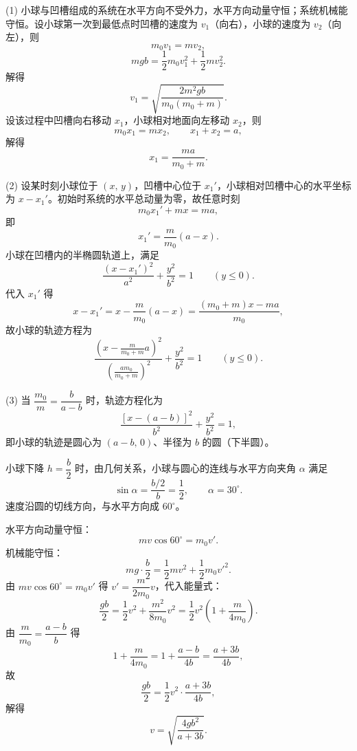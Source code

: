 \begin{answer}
(1) 小球与凹槽组成的系统在水平方向不受外力，水平方向动量守恒；系统机械能守恒。设小球第一次到最低点时凹槽的速度为 $v_{1}$（向右），小球的速度为 $v_{2}$（向左），则
\[
  m_{0}v_{1}=mv_{2},
\]
\[
  mgb=\frac{1}{2}m_{0}v_{1}^{2}+\frac{1}{2}mv_{2}^{2}.
\]
解得
\[
  v_{1}=\sqrt{\frac{2m^{2}gb}{m_{0}\left(m_{0}+m\right)}}.
\]
设该过程中凹槽向右移动 $x_{1}$，小球相对地面向左移动 $x_{2}$，则
\[
  m_{0}x_{1}=mx_{2},\qquad x_{1}+x_{2}=a,
\]
解得
\[
  x_{1}=\frac{ma}{m_{0}+m}.
\]

(2) 设某时刻小球位于 $(x,\,y)$，凹槽中心位于 $x_{1}'$，小球相对凹槽中心的水平坐标为 $x-x_{1}'$。初始时系统的水平总动量为零，故任意时刻
\[
  m_{0}x_{1}'+mx=ma,
\]
即
\[
  x_{1}'=\frac{m}{m_{0}}\left(a-x\right).
\]
小球在凹槽内的半椭圆轨道上，满足
\[
  \frac{\left(x-x_{1}'\right)^{2}}{a^{2}}+\frac{y^{2}}{b^{2}}=1\qquad(y\le0).
\]
代入 $x_{1}'$ 得
\[
  x-x_{1}'=x-\frac{m}{m_{0}}\left(a-x\right)
  =\frac{\left(m_{0}+m\right)x-ma}{m_{0}},
\]
故小球的轨迹方程为
\[
  \frac{\left(x-\frac{m}{m_{0}+m}a\right)^{2}}
       {\left(\frac{am_{0}}{m_{0}+m}\right)^{2}}
  +\frac{y^{2}}{b^{2}}=1\qquad(y\le0).
\]


(3) 当 $\dfrac{m_{0}}{m}=\dfrac{b}{a-b}$ 时，轨迹方程化为
\[
  \frac{\left[x-(a-b)\right]^{2}}{b^{2}}+\frac{y^{2}}{b^{2}}=1,
\]
即小球的轨迹是圆心为 $(a-b,\,0)$、半径为 $b$ 的圆（下半圆）。


小球下降 $h=\dfrac{b}{2}$ 时，由几何关系，小球与圆心的连线与水平方向夹角 $\alpha$ 满足
\[
  \sin\alpha=\frac{b/2}{b}=\frac{1}{2},\qquad \alpha=30^{\circ}.
\]
速度沿圆的切线方向，与水平方向成 $60^{\circ}$。

水平方向动量守恒：
\[
  mv\cos60^{\circ}=m_{0}v'.
\]
机械能守恒：
\[
  mg\cdot\frac{b}{2}=\frac{1}{2}mv^{2}+\frac{1}{2}m_{0}v'^{2}.
\]
由 $mv\cos60^{\circ}=m_{0}v'$ 得 $v'=\dfrac{m}{2m_{0}}v$，代入能量式：
\[
  \frac{gb}{2}=\frac{1}{2}v^{2}+\frac{m^{2}}{8m_{0}}v^{2}
  =\frac{1}{2}v^{2}\left(1+\frac{m}{4m_{0}}\right).
\]
由 $\dfrac{m}{m_{0}}=\dfrac{a-b}{b}$ 得
\[
  1+\frac{m}{4m_{0}}=1+\frac{a-b}{4b}=\frac{a+3b}{4b},
\]
故
\[
  \frac{gb}{2}=\frac{1}{2}v^{2}\cdot\frac{a+3b}{4b},
\]
解得
\[
  v=\sqrt{\frac{4gb^{2}}{a+3b}}.
\]
\end{answer}
